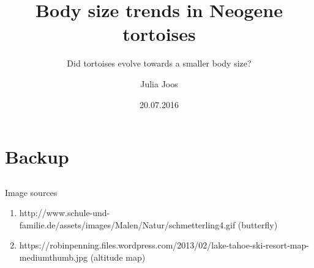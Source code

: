 \documentclass{beamer} %
\title{Body size trends in Neogene tortoises}
\subtitle{\small Did tortoises evolve towards a smaller body size?}
\author{Julia Joos}
\institute[OS]{Humboldt-Universität zu Berlin}
\date{20.07.2016}
\begin{document}

\begin{frame}[plain]
	\setcounter{framenumber}{0}
	\titlepage
\end{frame}






%






\appendix
\section[]{Backup}
\subsection[]{}

\begin{frame}[noframenumbering]{Image sources}%
\begin{footnotesize}
\begin{enumerate}
\item http://www.schule-und-familie.de/assets/images/Malen/Natur/schmetterling4.gif (butterfly)
\item https://robinpenning.files.wordpress.com/2013/02/lake-tahoe-ski-resort-map-mediumthumb.jpg (altitude map)
\end{enumerate}
\end{footnotesize}
\end{frame}

\setcounter{finalframe}{\value{framenumber}}
\end{document}
